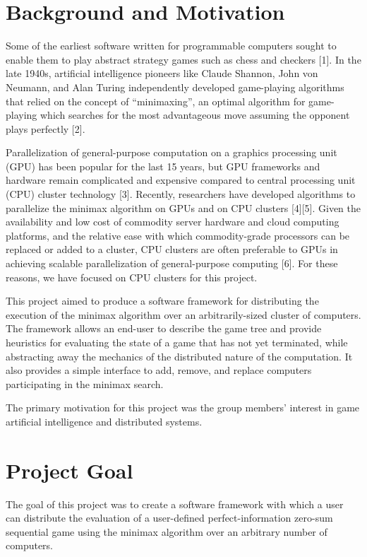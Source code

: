 \documentclass[pdftex,12pt,a4paper]{article}
\begin{document}
%
%
\section{Background and Motivation}
Some of the earliest software written for programmable computers sought to enable them to play abstract strategy games such as chess and checkers [1]. In the late 1940s, artificial intelligence pioneers like Claude Shannon, John von Neumann, and Alan Turing independently developed game-playing algorithms that relied on the concept of “minimaxing”, an optimal algorithm for game-playing which searches for the most advantageous move assuming the opponent plays perfectly [2].

Parallelization of general-purpose computation on a graphics processing unit (GPU) has been popular for the last 15 years, but GPU frameworks and hardware remain complicated and expensive compared to central processing unit (CPU) cluster technology [3]. Recently, researchers have developed algorithms to parallelize the minimax algorithm on GPUs and on CPU clusters [4][5]. Given the availability and low cost of commodity server hardware and cloud computing platforms, and the relative ease with which commodity-grade processors can be replaced or added to a cluster, CPU clusters are often preferable to GPUs in achieving scalable parallelization of general-purpose computing [6]. For these reasons, we have focused on CPU clusters for this project.

This project aimed to produce a software framework for distributing the execution of the minimax algorithm over an arbitrarily-sized cluster of computers. The framework allows an end-user to describe the game tree and provide heuristics for evaluating the state of a game that has not yet terminated, while abstracting away the mechanics of the distributed nature of the computation. It also provides a simple interface to add, remove, and replace computers participating in the minimax search. 

The primary motivation for this project was the group members’ interest in game artificial intelligence and distributed systems.

%
%
\section{Project Goal}

The goal of this project was to create a software framework with which a user can distribute the evaluation of a user-defined perfect-information zero-sum sequential game using the minimax algorithm over an arbitrary number of computers.
\end{document}

